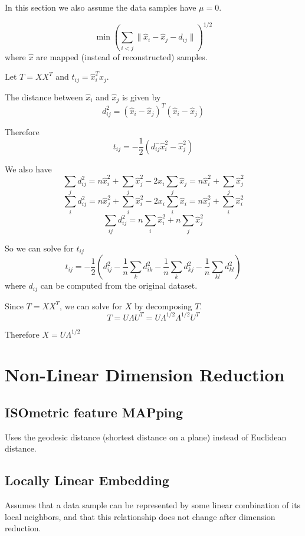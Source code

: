     In this section we also assume the data samples have $\mu=0$.

    \[ \min \left(\sum_{i<j}\|\hat{x}_i-\hat{x}_j-d_{ij}\|\right)^{1/2} \]
    where $\hat{x}$ are mapped (instead of reconstructed) samples.

    Let $T=XX^T$ and $t_{ij}=\hat{x}_i^T\hat{x}_j$.

    The distance between $\hat{x}_i$ and $\hat{x}_j$ is given by
    \[d_{ij}^2 = (\hat{x}_i-\hat{x}_j)^T(\hat{x}_i-\hat{x}_j)\]

    Therefore
    \[ t_{ij} = -\frac{1}{2}(d_{ij}^-\hat{x}_i^2-\hat{x}_j^2) \]

    We also have
    \[\sum_j d_{ij}^2 = n\hat{x}_i^2 + \sum_j\hat{x}_j^2 - 2x_i\sum_j\hat{x}_j = n\hat{x}_i^2 + \sum_j\hat{x}_j^2\]
    \[\sum_i d_{ij}^2 = n\hat{x}_j^2 + \sum_i\hat{x}_i^2 - 2x_i\sum_i\hat{x}_i = n\hat{x}_j^2 + \sum_i\hat{x}_i^2\]
    \[\sum_{ij}d_{ij}^2=n\sum_i\hat{x}_i^2 + n\sum_j\hat{x}_j^2 \]

    So we can solve for $t_{ij}$
    \[ t_{ij} = -\frac{1}{2}\left(d_{ij}^2-\frac{1}{n}\sum_kd_{ik}^2-\frac{1}{n}\sum_kd_{kj}^2-\frac{1}{n}\sum_{kl}d_{kl}^2\right) \]
    where $d_{ij}$ can be computed from the original dataset.

    Since $T=XX^T$, we can solve for $X$ by decomposing $T$.
    \[T = U\Lambda U^T = U\Lambda^{1/2}\Lambda^{1/2}U^T\]

    Therefore $X=U\Lambda^{1/2}$


\section{Non-Linear Dimension Reduction}
    \subsection{ISOmetric feature MAPping}
        Uses the geodesic distance (shortest distance on a plane) instead of Euclidean distance.

    \subsection{Locally Linear Embedding}
        Assumes that a data sample can be represented by some linear combination of its local neighbors, and that this relationship does not change after dimension reduction.
